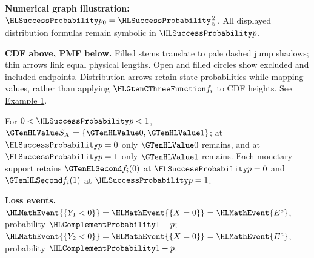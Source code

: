 {\begin{center}
\end{center}
\textbf{Numerical graph illustration:} $\SuccessProb{p_0}=\SuccessProb{\frac{2}{5}}$. All displayed distribution formulas remain symbolic in $\SuccessProb{p}$.
\par\textbf{CDF above, PMF below.} Filled stems translate to pale dashed jump shadows; thin arrows link equal physical lengths. Open and filled circles show excluded and included endpoints. Distribution arrows retain state probabilities while mapping values, rather than applying $\TransformationFunction{f_i}$ to CDF heights. See \hyperref[ex:intro-one]{Example 1}.\par
For $0<\SuccessProb{p}<1$, $\Indicator{S_X}=\{\Indicator{0},\Indicator{1}\}$; at $\SuccessProb{p}=0$ only $\Indicator{0}$ remains, and at $\SuccessProb{p}=1$ only $\Indicator{1}$ remains. Each monetary support retains $\Money{f_i(0)}$ at $\SuccessProb{p}=0$ and $\Money{f_i(1)}$ at $\SuccessProb{p}=1$.
\par\textbf{Loss events.} $\HLMathEvent{\{Y_1<0\}}=\HLMathEvent{\{X=0\}}=\HLMathEvent{E^c}$, probability $\FailureProb{1-p}$; $\HLMathEvent{\{Y_2<0\}}=\HLMathEvent{\{X=0\}}=\HLMathEvent{E^c}$, probability $\FailureProb{1-p}$.
\endgroup
}
